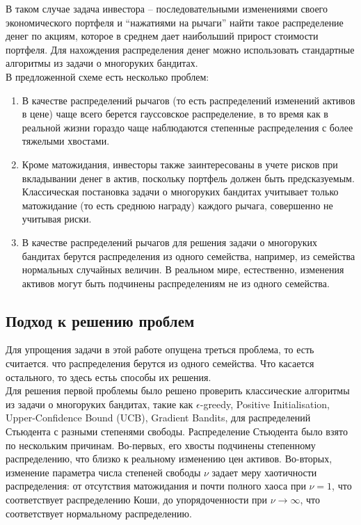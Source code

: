 В таком случае задача инвестора -- последовательными изменениями своего экономического портфеля и  ``нажатиями на рычаги'' найти такое распределение денег по акциям, которое в среднем дает наибольший прирост стоимости портфеля. Для нахождения распределения денег можно использовать стандартные алгоритмы из задачи о многоруких бандитах. \\

В предложенной схеме есть несколько проблем:
\begin{enumerate}
    \item В качестве распределений рычагов (то есть распределений изменений активов в цене) чаще всего берется гауссовское распределение, в то время как в реальной жизни гораздо чаще наблюдаются степенные распределения с более тяжелыми хвостами.
    \item Кроме матожидания, инвесторы также заинтересованы в учете рисков при вкладывании денег в актив, поскольку портфель должен быть предсказуемым. Классическая постановка задачи о многоруких бандитах учитывает только матожидание (то есть среднюю награду) каждого рычага, совершенно не учитывая риски.
    \item В качестве распределений рычагов для решения задачи о многоруких бандитах берутся распределения из одного семейства, например, из семейства нормальных случайных величин. В реальном мире, естественно, изменения активов могут быть подчинены распределениям не из одного семейства.
\end{enumerate}

\subsection{Подход к решению проблем}

Для упрощения задачи в этой работе опущена треться проблема, то есть считается. что распределения берутся из одного семейства. Что касается остального, то здесь естьь способы их решения. \\

Для решения первой проблемы было решено проверить классические алгоритмы из задачи о многоруких бандитах, такие как $\epsilon$-greedy, Positive Initialisation, Upper-Confidence Bound (UCB), Gradient Bandits, для распределений Стьюдента с разными степенями свободы. Распределение Стьюдента было взято по нескольким причинам. Во-первых, его хвосты подчинены степенному распределению, что близко к реальному изменению цен активов. Во-вторых, изменение параметра числа степеней свободы $\nu$ задает меру хаотичности распределения: от отсутствия матожидания и почти полного хаоса при $\nu=1$, что соответствует распределению Коши, до упорядоченности при $\nu \to \infty$, что соответствует нормальному распределению. \\

